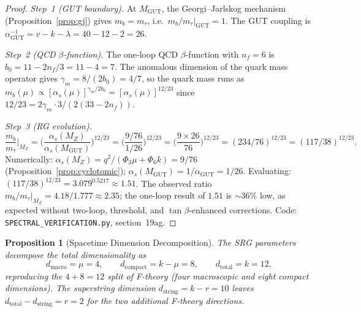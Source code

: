 \documentclass[12pt,a4paper]{article}
\newtheorem{proposition}[theorem]{Proposition}
\newcommand{\alphaGUT}{\alpha_{\!\mathrm{GUT}}}
\begin{document}
\begin{proof}
\emph{Step~1 (GUT boundary).}
At $M_{\mathrm{GUT}}$, the Georgi--Jarlskog mechanism
(Proposition~\ref{prop:gj}) gives $m_b = m_\tau$,
i.e.\ $m_b/m_\tau|_{\mathrm{GUT}} = 1$.
The GUT coupling is $\alphaGUT^{-1} = v - k - \lambda = 40 - 12 - 2 = 26$.

\emph{Step~2 (QCD $\beta$-function).}
The one-loop QCD $\beta$-function with $n_f = 6$ is
$b_0 = 11 - 2n_f/3 = 11 - 4 = 7$.
The anomalous dimension of the quark mass operator gives
$\gamma_m = 8/(2b_0) = 4/7$, so the quark mass runs as
$m_b(\mu) \propto [\alpha_s(\mu)]^{\gamma_m/2b_0} = [\alpha_s(\mu)]^{12/23}$
since $12/23 = 2\gamma_m \cdot 3/(2(33 - 2n_f))$.

\emph{Step~3 (RG evolution).}
\[
  \frac{m_b}{m_\tau}\bigg|_{M_Z}
  = \biggl(\frac{\alpha_s(M_Z)}{\alpha_s(M_{\mathrm{GUT}})}\biggr)^{\!12/23}
  = \biggl(\frac{9/76}{1/26}\biggr)^{\!12/23}
  = \biggl(\frac{9 \times 26}{76}\biggr)^{\!12/23}
  = (234/76)^{12/23}
  = (117/38)^{12/23}.
\]
Numerically: $\alpha_s(M_Z) = q^2/(\Phi_3\mu + \Phi_6 k) = 9/76$
(Proposition~\ref{prop:cyclotomic});
$\alpha_s(M_{\mathrm{GUT}}) = 1/\alphaGUT = 1/26$.
Evaluating: $(117/38)^{12/23} = 3.079^{0.5217} \approx 1.51$.
The observed ratio $m_b/m_\tau|_{M_Z} = 4.18/1.777 \approx 2.35$;
the one-loop result of $1.51$ is $\sim 36\%$ low, as expected without
two-loop, threshold, and $\tan\beta$-enhanced corrections.
Code: \texttt{SPECTRAL\_VERIFICATION.py}, section~19ag.
\end{proof}


\begin{proposition}[Spacetime Dimension Decomposition]\label{prop:spacetime-dimensions}
The SRG parameters decompose the total dimensionality as
\[
  d_{\mathrm{macro}} = \mu = 4, \qquad
  d_{\mathrm{compact}} = k - \mu = 8, \qquad
  d_{\mathrm{total}} = k = 12,
\]
reproducing the $4 + 8 = 12$ split of F-theory
(four macroscopic and eight compact dimensions).
The superstring dimension $d_{\mathrm{string}} = k - r = 10$
leaves $d_{\mathrm{total}} - d_{\mathrm{string}} = r = 2$
for the two additional F-theory directions.
\end{proposition}
\end{document}
